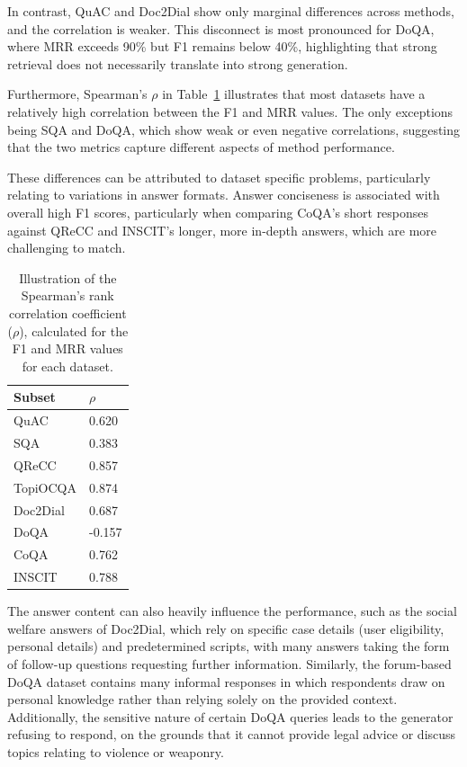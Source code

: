 \documentclass[11pt]{article}
\begin{document}
In contrast, QuAC and Doc2Dial show only marginal differences across methods, and the correlation is weaker. This disconnect is most pronounced for DoQA, where MRR exceeds 90\% but F1 remains below 40\%, highlighting that strong retrieval does not necessarily translate into strong generation. 

Furthermore, Spearman's  $\rho$ in Table~\ref{table:spearman} illustrates that most datasets have a relatively high correlation between the F1 and MRR values. The only exceptions being SQA and DoQA, which show weak or even negative correlations, suggesting that the two metrics capture different aspects of method performance.

These differences can be attributed to dataset specific problems, particularly relating to variations in answer formats. Answer conciseness is associated with overall high F1 scores, particularly when comparing CoQA's short responses against QReCC and INSCIT's longer, more in-depth answers, which are more challenging to match. 

\begin{table}[!htbp]
\centering
\begin{tabular}{l | l}
\toprule
\textbf{Subset} & \textbf{$\rho$} \\
\midrule
QuAC         & 0.620 \\
SQA          & 0.383 \\
QReCC        & 0.857 \\
TopiOCQA     & 0.874 \\
Doc2Dial     & 0.687 \\
DoQA         & -0.157 \\
CoQA         & 0.762 \\
INSCIT       & 0.788 \\
\bottomrule
\end{tabular}
\caption{Illustration of the Spearman's rank correlation coefficient ($\rho$), calculated for the F1 and MRR values for each dataset.}
\label{table:spearman}
\end{table}

The answer content can also heavily influence the performance, such as the social welfare answers of Doc2Dial, which rely on specific case details (user eligibility, personal details) and predetermined scripts, with many answers taking the form of follow-up questions requesting further information. Similarly, the forum-based DoQA dataset contains many informal responses in which respondents draw on personal knowledge rather than relying solely on the provided context. Additionally, the sensitive nature of certain DoQA queries leads to the generator refusing to respond, on the grounds that it cannot provide legal advice or discuss topics relating to violence or weaponry. 
\end{document}
